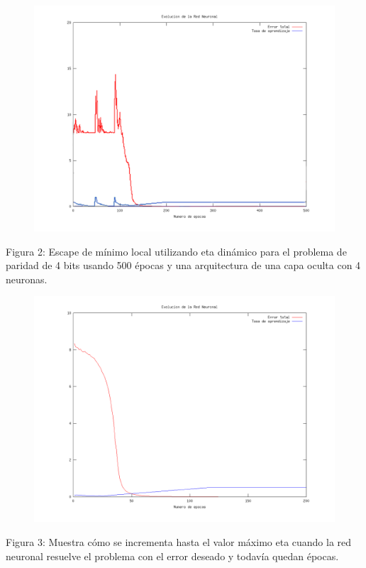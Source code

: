 \documentclass[%
    final,
    reprint,
    notitlepage,
    narroweqnarray,
    inline,
    twoside,
    invited
    ]{ieee}
\begin{document}
\begin{figure}[H]
\begin{center}
\includegraphics[scale=0.30]{./images/escapeminlocal.png}
\label{modelado}
\end{center}
\end{figure}

\begin{center}
\par Figura 2: Escape de mínimo local utilizando eta dinámico para el problema de paridad de 4 bits usando 500 épocas y una arquitectura de una capa oculta con 4 neuronas.
\end{center}

\clearpage

\begin{figure}[H]
\begin{center}
\includegraphics[scale=0.30]{./images/incremento.png}
\label{modelado}
\end{center}
\end{figure}

\begin{center}
\par Figura 3: Muestra cómo se incrementa hasta el valor máximo eta cuando la red neuronal resuelve el problema con el error deseado y todavía quedan épocas.
\end{center}




\end{document}
